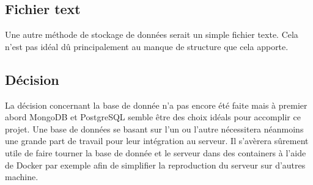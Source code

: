 \subsection{Fichier text}
Une autre méthode de stockage de données serait un simple fichier texte. Cela n'est pas idéal dû principalement au manque de structure que cela apporte.

\subsection{Décision}
La décision concernant la base de donnée n'a pas encore été faite mais à premier abord MongoDB et PostgreSQL semble être des choix idéals pour accomplir ce projet. Une base de données se basant sur l'un ou l'autre nécessitera néanmoins une grande part de travail pour leur intégration au serveur.
Il s'avèrera sûrement utile de faire tourner la base de donnée et le serveur dans des containers à l'aide de Docker par exemple afin de simplifier la reproduction du serveur sur d'autres machine.
